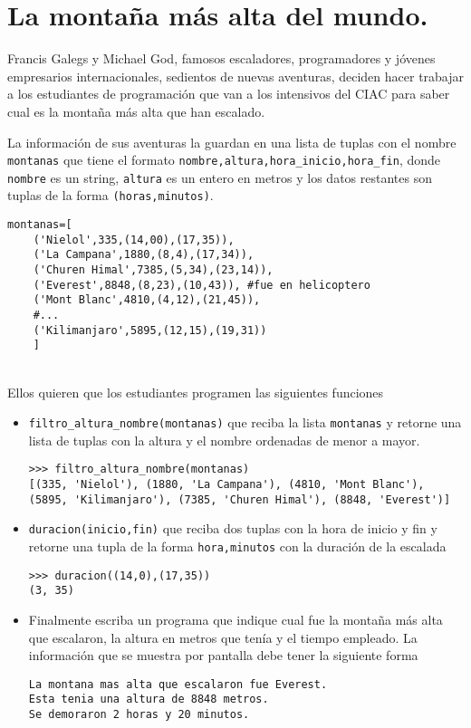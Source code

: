 \section{La montaña más alta del mundo.}

Francis Galegs y Michael God, famosos escaladores, programadores y jóvenes empresarios internacionales, sedientos de nuevas aventuras, deciden hacer trabajar a los estudiantes de programación que van a los intensivos del CIAC para saber cual es la montaña más alta que han escalado.

La información de sus aventuras la guardan en una lista de tuplas con el nombre \texttt{montanas} que tiene el formato \texttt{nombre,altura,hora\_inicio,hora\_fin}, donde \texttt{nombre} es un string, \texttt{altura} es un entero en metros y los datos restantes son tuplas de la forma \texttt{(horas,minutos)}.
\\
\begin{lstlisting}[style=consola]
montanas=[
    ('Nielol',335,(14,00),(17,35)),
    ('La Campana',1880,(8,4),(17,34)),
    ('Churen Himal',7385,(5,34),(23,14)),
    ('Everest',8848,(8,23),(10,43)), #fue en helicoptero
    ('Mont Blanc',4810,(4,12),(21,45)),
    #...
    ('Kilimanjaro',5895,(12,15),(19,31))
    ]

\end{lstlisting}
\\
Ellos quieren que los estudiantes programen las siguientes funciones

\begin{itemize}
    \item \texttt{filtro\_altura\_nombre(montanas)} que reciba la lista \texttt{montanas} y retorne una lista de tuplas con la altura y el nombre ordenadas de menor a mayor.
    \\
    \begin{lstlisting}[style=consola]
>>> filtro_altura_nombre(montanas)
[(335, 'Nielol'), (1880, 'La Campana'), (4810, 'Mont Blanc'), 
(5895, 'Kilimanjaro'), (7385, 'Churen Himal'), (8848, 'Everest')]
    \end{lstlisting}

    \item \texttt{duracion(inicio,fin)} que reciba dos tuplas con la hora de inicio y fin y retorne una tupla de la forma \texttt{hora,minutos} con la duración de la escalada
    \\
    \begin{lstlisting}[style=consola]
>>> duracion((14,0),(17,35))
(3, 35)
    \end{lstlisting}
    \item Finalmente escriba un programa que indique cual fue la montaña más alta que escalaron, la altura en metros que tenía y el tiempo empleado. La información que se muestra por pantalla debe tener la siguiente forma
    \begin{lstlisting}[style=consola]
La montana mas alta que escalaron fue Everest.
Esta tenia una altura de 8848 metros.
Se demoraron 2 horas y 20 minutos.
    \end{lstlisting}
    
\end{itemize}